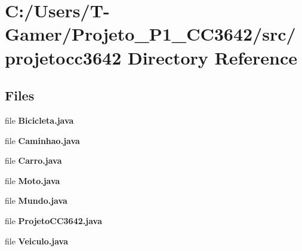\section{C\+:/\+Users/\+T-\/\+Gamer/\+Projeto\+\_\+\+P1\+\_\+\+C\+C3642/src/projetocc3642 Directory Reference}
\label{dir_890a40f391f3d72dfd1bfa2e6e687c88}
\subsection*{Files}
\begin{DoxyCompactItemize}
\item 
file \textbf{ Bicicleta.\+java}
\item 
file \textbf{ Caminhao.\+java}
\item 
file \textbf{ Carro.\+java}
\item 
file \textbf{ Moto.\+java}
\item 
file \textbf{ Mundo.\+java}
\item 
file \textbf{ Projeto\+C\+C3642.\+java}
\item 
file \textbf{ Veiculo.\+java}
\end{DoxyCompactItemize}
